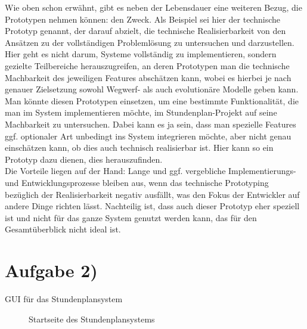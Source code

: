 \documentclass{swp1}
\begin{document}
Wie oben schon erwähnt, gibt es neben der Lebensdauer eine weiteren Bezug, die Prototypen nehmen können: den Zweck. Als Beispiel sei hier der technische Prototyp genannt, der darauf abzielt, die technische Realisierbarkeit von den Ansätzen zu der vollständigen Problemlösung zu untersuchen und darzustellen. Hier geht es nicht darum, Systeme vollständig zu implementieren, sondern gezielte Teilbereiche herauszugreifen, an deren Prototypen man die technische Machbarkeit des jeweiligen Features abschätzen kann, wobei es  hierbei je nach genauer Zielsetzung sowohl Wegwerf- als auch evolutionäre Modelle geben kann. \\
Man könnte diesen Prototypen einsetzen, um eine bestimmte Funktionalität, die man im System implementieren möchte, im Stundenplan-Projekt auf seine Machbarkeit zu untersuchen. Dabei kann es ja sein, dass man spezielle Features ggf. optionaler Art unbedingt ins System integrieren möchte, aber nicht genau einschätzen kann, ob dies auch technisch realisierbar ist. Hier kann so ein Prototyp dazu dienen, dies herauszufinden.\\
Die Vorteile liegen auf der Hand: Lange und ggf. vergebliche Implementierungs- und Entwicklungsprozesse bleiben aus, wenn das technische Prototyping bezüglich der Realisierbarkeit negativ ausfällt, was den Fokus der Entwickler auf andere Dinge richten lässt. Nachteilig ist, dass auch dieser Prototyp eher speziell ist und nicht für das ganze System genutzt werden kann, das für den Gesamtüberblick nicht ideal ist. 
 
\section*{Aufgabe 2)}
GUI für das Stundenplansystem
\clearpage


\begin{figure}
\caption{Startseite des Stundenplansystems }
\label{ab1}
\end{figure}
\end{document}
